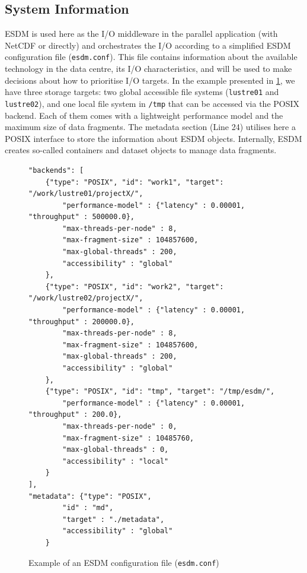 \documentclass{superfri}
\begin{document}
\subsection{System Information}

ESDM is used here as the I/O middleware in the parallel application (with NetCDF or directly) and orchestrates the I/O according to a simplified ESDM configuration file (\texttt{esdm.conf}).
This file contains information about the available technology in the data centre, its I/O characteristics, and will be used to make decisions about how to prioritise I/O targets.
In the example presented in \cref{lst:esdm.conf}, we have three storage targets: two global accessible file systems (\texttt{lustre01} and \texttt{lustre02}), and one local file system in \texttt{/tmp} that can be accessed via the POSIX backend.
Each of them comes with a lightweight performance model and the maximum size of data fragments.
The metadata section (Line 24) utilises here a POSIX interface to store the information about ESDM objects. Internally, ESDM creates so-called containers and dataset objects to manage data fragments.

\begin{figure}[!ht]

\begin{lstlisting}
"backends": [
    {"type": "POSIX", "id": "work1", "target": "/work/lustre01/projectX/",
        "performance-model" : {"latency" : 0.00001, "throughput" : 500000.0},
        "max-threads-per-node" : 8,
        "max-fragment-size" : 104857600,
        "max-global-threads" : 200,
        "accessibility" : "global"
    },
    {"type": "POSIX", "id": "work2", "target": "/work/lustre02/projectX/",
        "performance-model" : {"latency" : 0.00001, "throughput" : 200000.0},
        "max-threads-per-node" : 8,
        "max-fragment-size" : 104857600,
        "max-global-threads" : 200,
        "accessibility" : "global"
    },
    {"type": "POSIX", "id": "tmp", "target": "/tmp/esdm/",
        "performance-model" : {"latency" : 0.00001, "throughput" : 200.0},
        "max-threads-per-node" : 0,
        "max-fragment-size" : 10485760,
        "max-global-threads" : 0,
        "accessibility" : "local"
    }
],
"metadata": {"type": "POSIX",
        "id" : "md",
        "target" : "./metadata",
        "accessibility" : "global"
    }
\end{lstlisting}

\caption{Example of an ESDM configuration file (\texttt{esdm.conf})}
\label{lst:esdm.conf}
\end{figure}
\end{document}
